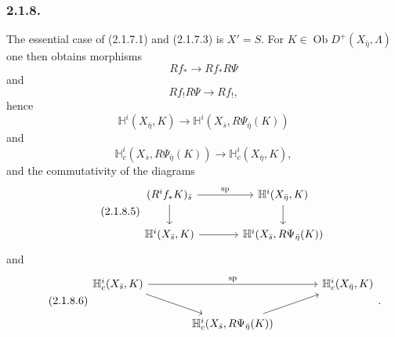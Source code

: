 \subsubsection*{2.1.8.}
The essential case of (2.1.7.1) and (2.1.7.3) is $X'=S$.  For
$K\in\operatorname{Ob}D^+(X_{\bar\eta},\Lambda)$ one then obtains
morphisms
\begin{equation}\tag{2.1.8.1}
Rf_*\longrightarrow Rf_*R\Psi
\end{equation}
and
\begin{equation}\tag{2.1.8.2}
Rf_!R\Psi\longrightarrow Rf_!,
\end{equation}
hence
\begin{equation}\tag{2.1.8.3}
\mathbb H^i(X_{\bar\eta},K)
\longrightarrow
\mathbb H^i(X_{\bar s},R\Psi_{\bar\eta}(K))
\end{equation}
and
\begin{equation}\tag{2.1.8.4}
\mathbb H_c^i(X_{\bar s},R\Psi_{\bar\eta}(K))
\longrightarrow
\mathbb H_c^i(X_{\bar\eta},K),
\end{equation}
and the commutativity of the diagrams
\begin{equation}\tag{2.1.8.5}
\begin{tikzcd}[column sep=large]
(R^if_*K)_{\bar s} \arrow[r, "\mathrm{sp}"] \arrow[d]
  & \mathbb H^i(X_{\bar\eta},K) \arrow[d] \\
\mathbb H^i(X_{\bar s},K) \arrow[r]
  & \mathbb H^i(X_{\bar s},R\Psi_{\bar\eta}(K))
\end{tikzcd}
\end{equation}
and
\begin{equation}\tag{2.1.8.6}
\begin{tikzcd}[column sep=large]
\mathbb H_c^i(X_{\bar s},K) \arrow[rr, "\mathrm{sp}"] \arrow[dr]
  & {} & \mathbb H_c^i(X_{\bar\eta},K) \\
{} & \mathbb H_c^i(X_{\bar s},R\Psi_{\bar\eta}(K)) \arrow[ur] & {}
\end{tikzcd}
.\end{equation}

